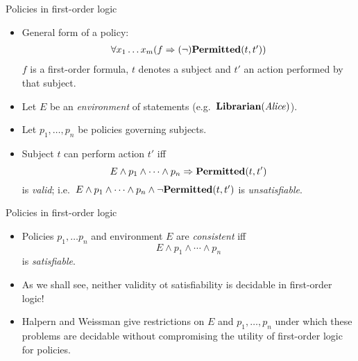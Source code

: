 \documentclass[style=sailor,size=12pt]{powerdot}
\newcommand{\id}[1]{\mbox{\it #1\/}}
\newcommand{\bid}[1]{\mbox{\bf #1}}
\theoremstyle{definition}
\begin{document}
\begin{wideslide}[bm=,toc=]{Policies in first-order logic}
\begin{itemize}
\item General form of a policy:
\begin{displaymath}
\begin{array}{l}
\forall x_1\ldots x_m(f \Rightarrow (\neg)\bid{Permitted}(t,t'))
\end{array}
\end{displaymath}
$f$ is a first-order formula, $t$ denotes a subject and $t'$ an action performed by that subject.
\item Let $E$ be an {\em environment\/} of statements (e.g.\ $\bid{Librarian}(\id{Alice})$).
\item Let $p_1,\ldots ,p_n$ be policies governing subjects.
\item Subject $t$ can perform action $t'$ iff 
\begin{displaymath}
E\wedge p_1 \wedge \cdots \wedge p_n \Rightarrow \bid{Permitted}(t,t')
\end{displaymath}
is {\em valid\/}; i.e.\ $E\wedge p_1 \wedge \cdots \wedge p_n \wedge \neg\bid{Permitted}(t,t')$ 
is {\em unsatisfiable\/}.
\end{itemize}
\end{wideslide}

\begin{wideslide}[bm=,toc=]{Policies in first-order logic}
\begin{itemize}
\item Policies $p_1,\dots p_n$ and environment $E$ are {\em consistent\/} iff
\begin{displaymath}
E\wedge p_1 \wedge \cdots \wedge p_n 
\end{displaymath}
is {\em satisfiable\/}.
\item As we shall see, neither validity ot satisfiability is decidable in first-order logic!
\item Halpern and Weissman give restrictions on $E$ and $p_1,\ldots ,p_n$ under which
these problems are decidable without compromising the utility of first-order logic for policies.
\end{itemize}
\end{wideslide}
\end{document}
